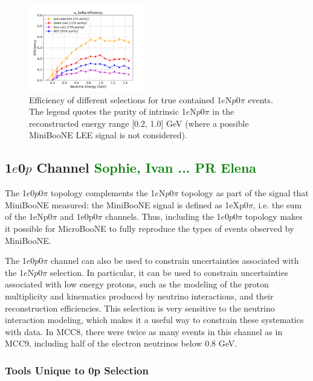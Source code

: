 \documentclass[a4paper]{article}
\newcommand{\npsel}{1$e$N$p$0$\pi$ }
\newcommand{\zpsel}{1$e$0$p$0$\pi$ }
\begin{document}
\begin{figure}[H]
\begin{center}
\includegraphics[width=0.45\textwidth]{1eNp/effpur_1eNp_cut_bdt.pdf}
\caption{\label{fig:1eNp:effpur:RUN1} Efficiency of different selections for true contained \npsel events. The legend quotes the purity of intrinsic \npsel in the reconstructed energy range [0.2, 1.0] \si{\GeV} (where a possible MiniBooNE LEE signal is not considered).}
\end{center}
\end{figure}

\subsection{1$e$0$p$ Channel \textcolor{green}{Sophie, Ivan ... PR Elena}}
\label{sec:nueselection:1e0p}

The \zpsel topology complements the \npsel topology as part of the signal that MiniBooNE measured: the MiniBooNE signal is defined as 1eXp0$\pi$, i.e. the sum of the 1eNp0$\pi$ and 1e0p0$\pi$ channels. Thus,  including the \zpsel topology makes it possible for MicroBooNE to fully reproduce the types of events observed by MiniBooNE.    

The \zpsel channel can also be used to constrain uncertainties associated with the \npsel selection.  In particular, it can be used to constrain uncertainties associated with low energy protons, such as the modeling of the proton multiplicity and kinematics produced by neutrino interactions, and their reconstruction efficiencies.  This selection is very sensitive to the neutrino interaction modeling, which makes it a useful way to constrain these systematics with data.  In MCC8, there were twice as many events in this channel as in MCC9, including half of the  electron neutrinos below 0.8 GeV.


\subsubsection{Tools Unique to 0p Selection}
\end{document}
